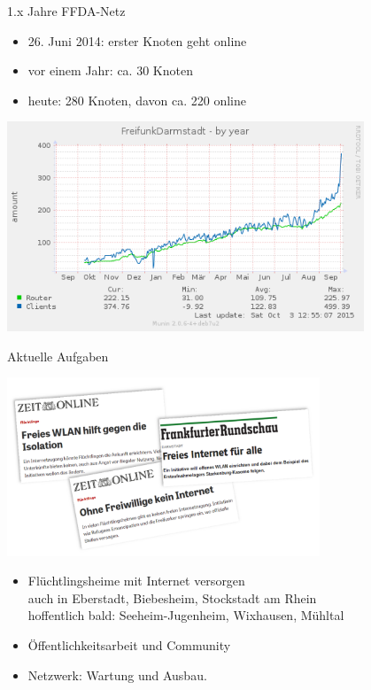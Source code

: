\documentclass[10pt]{beamer}
\begin{document}
\begin{frame}{1.x Jahre FFDA-Netz}
	\vfill
	\begin{itemize}[<+->]
		\item 26. Juni 2014: erster Knoten geht online
		\item vor einem Jahr: ca. 30 Knoten
		\item heute: 280 Knoten, davon ca. 220 online
	\end{itemize}
	\begin{center}
		{\includegraphics[width=0.8\textwidth]{images/ffda-Okt14-15}}
	\end{center}
\end{frame}


\begin{frame}{Aktuelle Aufgaben}

	\begin{center}
		\includegraphics[width=0.7\textwidth]{images/2015-10_presse-fluechtlinge}
	\end{center}
	\begin{itemize}[<+->]
		\item \large Flüchtlingsheime mit Internet versorgen\\
			\tiny auch in Eberstadt, Biebesheim, Stockstadt am Rhein\\
			\tiny hoffentlich bald: Seeheim-Jugenheim, Wixhausen, Mühltal
		\item Öffentlichkeitsarbeit und Community
		\item Netzwerk: Wartung und Ausbau.
	\end{itemize}


\end{frame}
\end{document}
